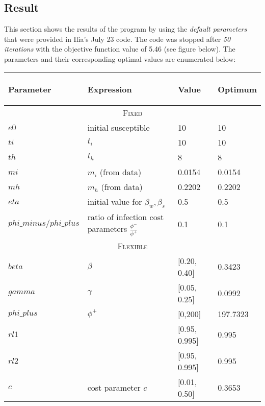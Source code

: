 \documentclass{../cls/NotesV2_Class}
\begin{document}
\subsection{Result}

This section shows the results of the program by using the \textit{default parameters} that were provided in Ilia's July 23 code. The code was stopped after \textit{50 iterations} with the objective function value of 5.46 (see figure below). The parameters and their corresponding optimal values are enumerated below:

\begin{center}
\begin{tabular}{ |p{3cm}||p{6cm}|p{2cm}|p{2cm}|  }
 \hline
 \begin{center}Parameter\end{center} & \begin{center}Expression\end{center} & \begin{center}Value\end{center} & \begin{center}Optimum\end{center} \\
 \hline
 \hline
 \multicolumn{4}{|c|}{\textsc{Fixed}} \\
 \hline
 $e0$   &  initial susceptible  & 10 & 10\\
 $ti$ & $t_i$ & 10 & 10 \\
 $th$ & $t_h$ & 8 & 8\\
 $mi$ & $m_i$ (from data) & 0.0154 & 0.0154 \\
 $mh$ & $m_h$ (from data) & 0.2202 & 0.2202\\
 $eta$ & initial value for $\beta_w,\beta_s$ & 0.5 & 0.5 \\
 $phi\_minus/phi\_plus$ & ratio of infection cost parameters $\frac{\phi^-}{\phi^+}$ & 0.1 & 0.1 \\
 \hline
 \multicolumn{4}{|c|}{\textsc{Flexible}} \\
 \hline
 $beta$ & $\beta$ & [0.20, 0.40] & 0.3423\\
 $gamma$ & $\gamma$ & [0.05, 0.25] & 0.0992 \\
 $phi\_plus$ & $\phi^+$ & [0,200] & 197.7323\\
 $rl1$ & & [0.95, 0.995] & 0.995\\
 $rl2$ & & [0.95, 0.995] & 0.995\\
 $c$ & cost parameter $c$ & [0.01, 0.50] & 0.3653\\
 \hline
\end{tabular}
\end{center}
\end{document}
